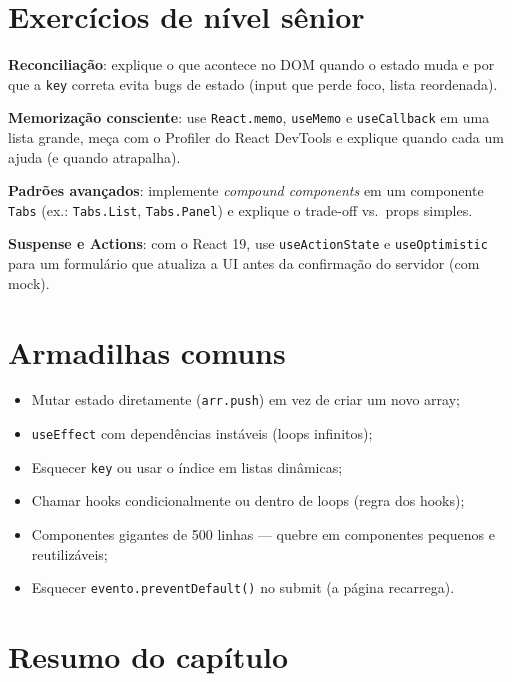 \section{Exercícios de nível sênior}

\begin{seniores}
  \item \textbf{Reconciliação}: explique o que acontece no DOM quando o estado muda e por que a \texttt{key} correta evita bugs de estado (input que perde foco, lista reordenada).
  \item \textbf{Memorização consciente}: use \texttt{React.memo}, \texttt{useMemo} e \texttt{useCallback} em uma lista grande, meça com o Profiler do React DevTools e explique quando cada um ajuda (e quando atrapalha).
  \item \textbf{Padrões avançados}: implemente \emph{compound components} em um componente \texttt{Tabs} (ex.: \texttt{Tabs.List}, \texttt{Tabs.Panel}) e explique o trade-off vs.\ props simples.
  \item \textbf{Suspense e Actions}: com o React 19, use \texttt{useActionState} e \texttt{useOptimistic} para um formulário que atualiza a UI antes da confirmação do servidor (com mock).
\end{seniores}

\section{Armadilhas comuns}

\begin{itemize}[leftmargin=*, itemsep=0.4em]
  \item Mutar estado diretamente (\texttt{arr.push}) em vez de criar um novo array;
  \item \texttt{useEffect} com dependências instáveis (loops infinitos);
  \item Esquecer \texttt{key} ou usar o índice em listas dinâmicas;
  \item Chamar hooks condicionalmente ou dentro de loops (regra dos hooks);
  \item Componentes gigantes de 500 linhas — quebre em componentes pequenos e reutilizáveis;
  \item Esquecer \texttt{evento.preventDefault()} no submit (a página recarrega).
\end{itemize}

\section{Resumo do capítulo}

